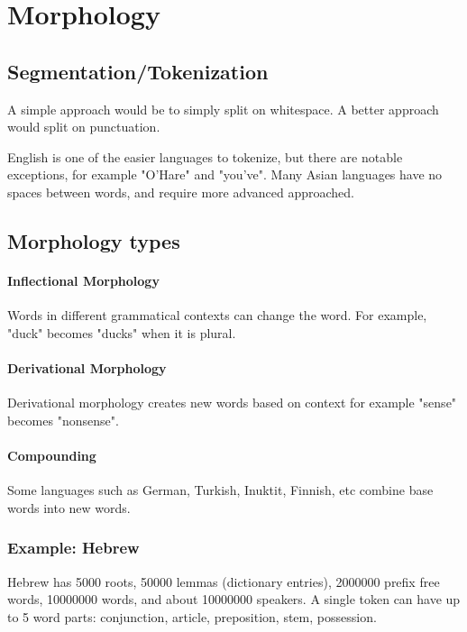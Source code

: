 \documentclass{idc_msc}
\begin{document}
\section{Morphology}

\subsection{Segmentation/Tokenization}

A simple approach would be to simply split on whitespace.
A better approach would split on punctuation.

English is one of the easier languages to tokenize, but there are notable exceptions, for example "O'Hare" and "you've".
Many Asian languages have no spaces between words, and require more advanced approached.

\subsection{Morphology types}

\paragraph{Inflectional Morphology}

Words in different grammatical contexts can change the word.
For example, "duck" becomes "ducks" when it is plural.

\paragraph{Derivational Morphology}

Derivational morphology creates new words based on context for example "sense" becomes "nonsense".

\paragraph{Compounding}

Some languages such as German, Turkish, Inuktit, Finnish, etc combine base words into new words.

\subsubsection{Example: Hebrew}

Hebrew has 5000 roots, 50000 lemmas (dictionary entries), 2000000 prefix free words, 10000000 words, and about 10000000 speakers.
A single token can have up to 5 word parts: conjunction, article, preposition, stem, possession.
\end{document}
